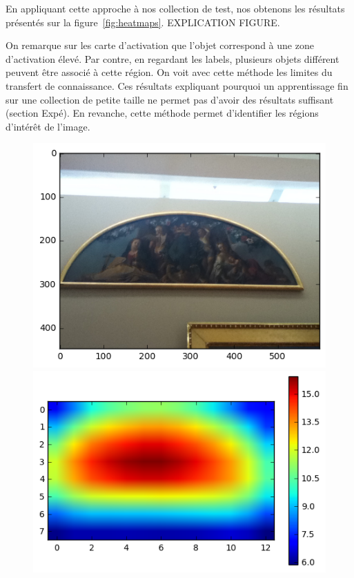 En appliquant cette approche à nos collection de test, nos obtenons les résultats présentés sur la figure~\ref{fig:heatmaps}. EXPLICATION FIGURE.

On remarque sur les carte d'activation que l'objet correspond à une zone d'activation élevé. Par contre, en regardant les labels, plusieurs objets différent peuvent être associé à cette région. On voit avec cette méthode les limites du transfert de connaissance. Ces résultats expliquant pourquoi un apprentissage fin sur une collection de petite taille ne permet pas d'avoir des résultats suffisant (section Expé). En revanche, cette méthode permet d'identifier les régions d'intérêt de l'image.


\begin{figure}
  \centering
  \begin{minipage}[c]{.33\linewidth}
    \includegraphics[width=\textwidth]{figures/sample1_10A-0519.png}
  \end{minipage} \hfill
  \begin{minipage}[c]{.33\linewidth}
    \includegraphics[width=\textwidth]{figures/sample1_heatmap.png}

\end{minipage}
\end{figure}
